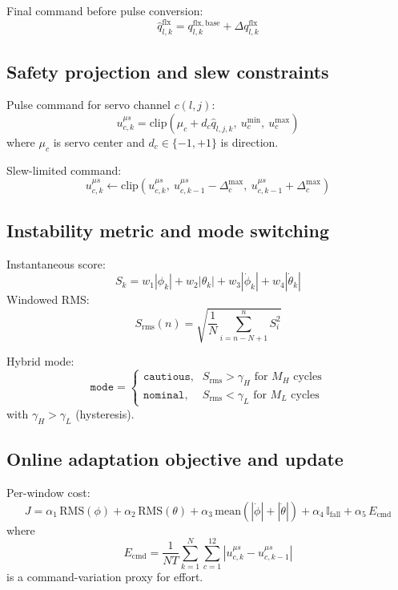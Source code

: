 \documentclass[11pt]{article}
\begin{document}
Final command before pulse conversion:
\begin{equation}
\hat{q}^{\mathrm{flx}}_{l,k}=q^{\mathrm{flx,base}}_{l,k}+\Delta q^{\mathrm{flx}}_{l,k}
\end{equation}

\subsection*{Safety projection and slew constraints}

Pulse command for servo channel $c(l,j)$:
\begin{equation}
u^{\mu s}_{c,k}=\mathrm{clip}\!\left(\mu_c+d_c\hat{q}_{l,j,k},\ u^{\min}_c,\ u^{\max}_c\right)
\end{equation}
where $\mu_c$ is servo center and $d_c\in\{-1,+1\}$ is direction.

Slew-limited command:
\begin{equation}
u^{\mu s}_{c,k}\leftarrow
\mathrm{clip}\!\left(u^{\mu s}_{c,k},\ u^{\mu s}_{c,k-1}-\Delta^{\max}_c,\ u^{\mu s}_{c,k-1}+\Delta^{\max}_c\right)
\end{equation}

\subsection*{Instability metric and mode switching}

Instantaneous score:
\begin{equation}
S_k=w_1|\phi_k|+w_2|\theta_k|+w_3|\dot{\phi}_k|+w_4|\dot{\theta}_k|
\end{equation}
Windowed RMS:
\begin{equation}
S_{\mathrm{rms}}(n)=\sqrt{\frac{1}{N}\sum_{i=n-N+1}^{n}S_i^2}
\end{equation}

Hybrid mode:
\[
\texttt{mode}=
\begin{cases}
\texttt{cautious}, & S_{\mathrm{rms}}>\gamma_H \text{ for } M_H \text{ cycles}\\
\texttt{nominal}, & S_{\mathrm{rms}}<\gamma_L \text{ for } M_L \text{ cycles}
\end{cases}
\]
with $\gamma_H>\gamma_L$ (hysteresis).

\subsection*{Online adaptation objective and update}

Per-window cost:
\begin{equation}
J=
\alpha_1\,\mathrm{RMS}(\phi)+
\alpha_2\,\mathrm{RMS}(\theta)+
\alpha_3\,\mathrm{mean}(|\dot{\phi}|+|\dot{\theta}|)+
\alpha_4\,\mathbb{I}_{\mathrm{fall}}+
\alpha_5\,E_{\mathrm{cmd}}
\end{equation}
where
\[
E_{\mathrm{cmd}}=\frac{1}{NT}\sum_{k=1}^{N}\sum_{c=1}^{12}|u^{\mu s}_{c,k}-u^{\mu s}_{c,k-1}|
\]
is a command-variation proxy for effort.
\end{document}
